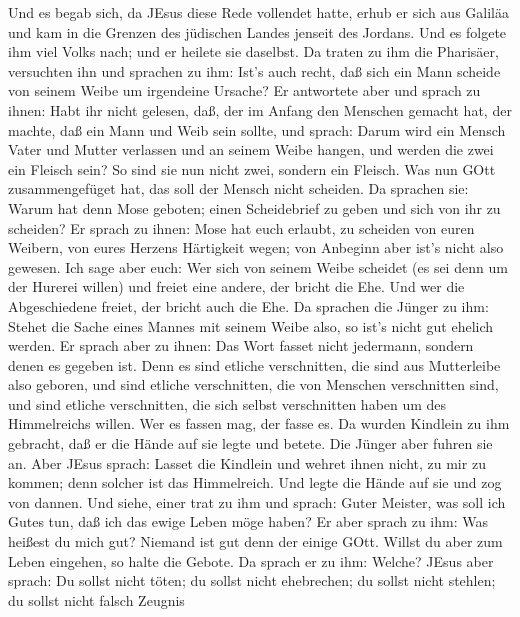  Und es begab sich, da JEsus diese Rede vollendet hatte,
erhub er sich aus Galiläa und kam in die Grenzen des jüdischen Landes
jenseit des Jordans.  Und es folgete ihm viel Volks nach;
und er heilete sie daselbst.  Da traten zu ihm die
Pharisäer, versuchten ihn und sprachen zu ihm: Ist's auch recht, daß
sich ein Mann scheide von seinem Weibe um irgendeine Ursache?
 Er antwortete aber und sprach zu ihnen: Habt ihr nicht
gelesen, daß, der im Anfang den Menschen gemacht hat, der machte, daß
ein Mann und Weib sein sollte,  und sprach: Darum wird ein
Mensch Vater und Mutter verlassen und an seinem Weibe hangen, und werden
die zwei ein Fleisch sein?  So sind sie nun nicht zwei,
sondern ein Fleisch. Was nun GOtt zusammengefüget hat, das soll der
Mensch nicht scheiden.  Da sprachen sie: Warum hat denn Mose
geboten; einen Scheidebrief zu geben und sich von ihr zu scheiden?
 Er sprach zu ihnen: Mose hat euch erlaubt, zu scheiden von
euren Weibern, von eures Herzens Härtigkeit wegen; von Anbeginn aber
ist's nicht also gewesen.  Ich sage aber euch: Wer sich von
seinem Weibe scheidet (es sei denn um der Hurerei willen) und freiet
eine andere, der bricht die Ehe. Und wer die Abgeschiedene freiet, der
bricht auch die Ehe.  Da sprachen die Jünger zu ihm: Stehet
die Sache eines Mannes mit seinem Weibe also, so ist's nicht gut ehelich
werden.  Er sprach aber zu ihnen: Das Wort fasset nicht
jedermann, sondern denen es gegeben ist.  Denn es sind
etliche verschnitten, die sind aus Mutterleibe also geboren, und sind
etliche verschnitten, die von Menschen verschnitten sind, und sind
etliche verschnitten, die sich selbst verschnitten haben um des
Himmelreichs willen. Wer es fassen mag, der fasse es.  Da
wurden Kindlein zu ihm gebracht, daß er die Hände auf sie legte und
betete. Die Jünger aber fuhren sie an.  Aber JEsus sprach:
Lasset die Kindlein und wehret ihnen nicht, zu mir zu kommen; denn
solcher ist das Himmelreich.  Und legte die Hände auf sie
und zog von dannen.  Und siehe, einer trat zu ihm und
sprach: Guter Meister, was soll ich Gutes tun, daß ich das ewige Leben
möge haben?  Er aber sprach zu ihm: Was heißest du mich
gut? Niemand ist gut denn der einige GOtt. Willst du aber zum Leben
eingehen, so halte die Gebote.  Da sprach er zu ihm:
Welche? JEsus aber sprach: Du sollst nicht töten; du sollst nicht
ehebrechen; du sollst nicht stehlen; du sollst nicht falsch Zeugnis
